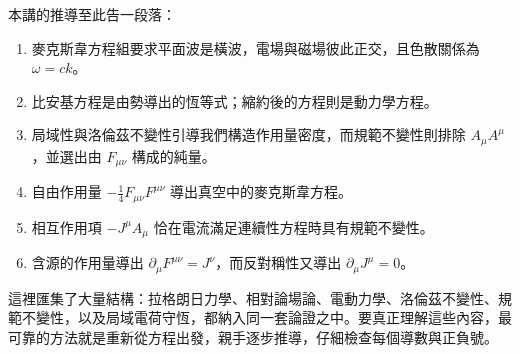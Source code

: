 本講的推導至此告一段落：
\begin{enumerate}
\item 麥克斯韋方程組要求平面波是橫波，電場與磁場彼此正交，且色散關係為
      \(\omega=ck\)。
\item 比安基方程是由勢導出的恆等式；縮約後的方程則是動力學方程。
\item 局域性與洛倫茲不變性引導我們構造作用量密度，而規範不變性則排除 \(A_\mu A^\mu\)，並選出由 \(F_{\mu\nu}\) 構成的純量。
\item 自由作用量
      \(-\tfrac14F_{\mu\nu}F^{\mu\nu}\) 導出真空中的麥克斯韋方程。
\item 相互作用項 \(-J^\mu A_\mu\) 恰在電流滿足連續性方程時具有規範不變性。
\item 含源的作用量導出
      \(\partial_\mu F^{\mu\nu}=J^\nu\)，而反對稱性又導出
      \(\partial_\mu J^\mu=0\)。
\end{enumerate}

這裡匯集了大量結構：拉格朗日力學、相對論場論、電動力學、洛倫茲不變性、規範不變性，以及局域電荷守恆，都納入同一套論證之中。要真正理解這些內容，最可靠的方法就是重新從方程出發，親手逐步推導，仔細檢查每個導數與正負號。